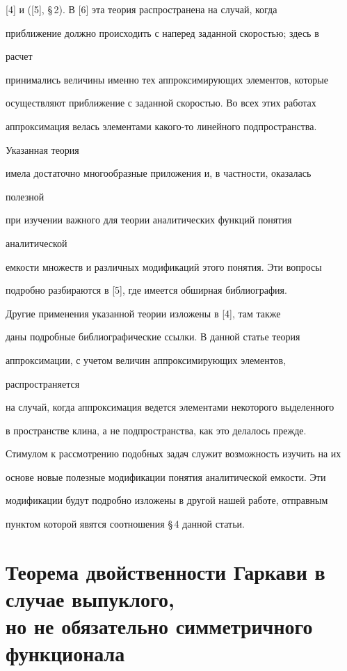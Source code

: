 [4] и  ([5], \S\,2). В [6] эта теория распространена на случай, когда 


приближение должно происходить с наперед заданной скоростью; здесь в 


расчет 


принимались величины именно тех аппроксимирующих элементов, которые 


осуществляют приближение с заданной скоростью. Во всех этих работах 


аппроксимация велась элементами какого-то линейного подпространства. 


Указанная теория 


имела достаточно многообразные приложения и, в частности, оказалась 


полезной 


при изучении важного для теории аналитических функций понятия 


аналитической 


емкости множеств и различных модификаций этого понятия. Эти вопросы 


подробно разбираются в [5], где имеется обширная библиография. 


Другие применения указанной теории изложены в [4], там также 


даны подробные библиографические ссылки. В данной статье теория 


аппроксимации, с учетом величин аппроксимирующих элементов, 


распространяется 


на случай, когда аппроксимация ведется элементами некоторого выделенного 


в пространстве клина, а не подпространства, как это делалось прежде. 


 


Стимулом к рассмотрению подобных задач служит возможность изучить на их 


основе новые полезные модификации понятия аналитической емкости. Эти 


модификации будут подробно изложены в другой нашей работе, отправным 


пунктом которой явятся соотношения \S\,4 данной статьи. 


 


\section{Теорема двойственности Гаркави в случае выпуклого, \protect\\ 


но не обязательно симметричного функционала} 


